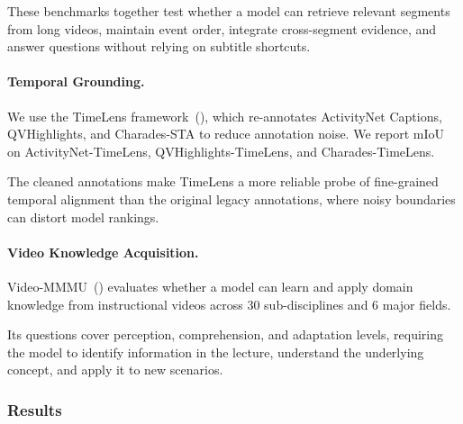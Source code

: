 \documentclass{llmxive}
\begin{document}
These benchmarks together test whether a model can retrieve relevant segments from long videos, maintain event order, integrate cross-segment evidence, and answer questions without relying on subtitle shortcuts.

\paragraph{Temporal Grounding.}
We use the TimeLens framework~(\cite{zhang2025timelens}), which re-annotates ActivityNet Captions, QVHighlights, and Charades-STA to reduce annotation noise. We report mIoU on ActivityNet-TimeLens, QVHighlights-TimeLens, and Charades-TimeLens.

The cleaned annotations make TimeLens a more reliable probe of fine-grained temporal alignment than the original legacy annotations, where noisy boundaries can distort model rankings.

\paragraph{Video Knowledge Acquisition.}
Video-MMMU~(\cite{videommmu}) evaluates whether a model can learn and apply domain knowledge from instructional videos across 30 sub-disciplines and 6 major fields.

Its questions cover perception, comprehension, and adaptation levels, requiring the model to identify information in the lecture, understand the underlying concept, and apply it to new scenarios.

\subsubsection{Results}
\end{document}
